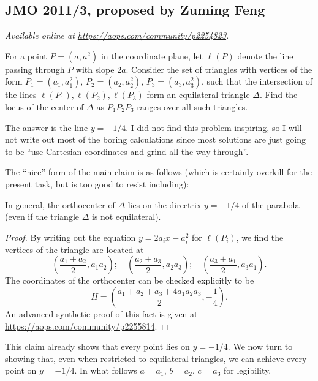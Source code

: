 \documentclass[11pt]{scrartcl}
\begin{document}
\subsection{JMO 2011/3, proposed by Zuming Feng}
\textsl{Available online at \url{https://aops.com/community/p2254823}.}
\begin{mdframed}[style=mdpurplebox,frametitle={Problem statement}]
For a point $P = (a,a^2)$ in the coordinate plane,
let $\ell(P)$ denote the line passing through $P$ with slope $2a$.
Consider the set of triangles with vertices of the form
$P_1 = (a_1, a_1^2)$, $P_2 = (a_2, a_2^2)$, $P_3 = (a_3, a_3^2)$,
such that the intersection of the lines $\ell(P_1), \ell(P_2), \ell(P_3)$
form an equilateral triangle $\Delta$.
Find the locus of the center of $\Delta$ as $P_1P_2P_3$ ranges over all such triangles.
\end{mdframed}
The answer is the line $y = -1/4$.
I did not find this problem inspiring,
so I will not write out most of the boring calculations
since most solutions are just going to be
``use Cartesian coordinates and grind all the way through''.

The ``nice'' form of the main claim is as follows
(which is certainly overkill for the present task,
but is too good to resist including):
\begin{claim*}
  In general, the orthocenter of $\Delta$ lies on
  the directrix $y = -1/4$ of the parabola
  (even if the triangle $\Delta$ is not equilateral).
\end{claim*}
\begin{proof}
  By writing out the equation $y = 2a_i x - a_i^2$ for $\ell(P_i)$,
  we find the vertices of the triangle are located at
  \[
    \left( \frac{a_1+a_2}{2}, a_1a_2 \right); \quad
    \left( \frac{a_2+a_3}{2}, a_2a_3 \right); \quad
    \left( \frac{a_3+a_1}{2}, a_3a_1 \right).
  \]
  The coordinates of the orthocenter can be checked explicitly to be
  \[ H = \left( \frac{a_1 + a_2 + a_3 + 4 a_1 a_2 a_3}{2},
      - \frac 14 \right). \]
  An advanced synthetic proof of this fact is given at
  \url{https://aops.com/community/p2255814}.
\end{proof}

This claim already shows that every point lies on $y = -1/4$.
We now turn to showing that, even when restricted to equilateral triangles,
we can achieve every point on $y = -1/4$.
In what follows $a = a_1$, $b = a_2$, $c = a_3$ for legibility.
\end{document}
